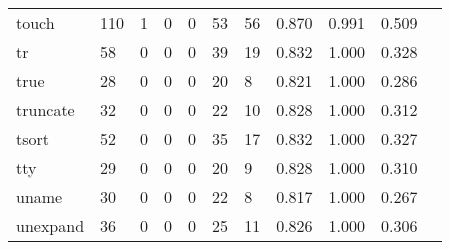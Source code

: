 \begin{longtable}{lp{1.10cm}p{1.10cm}p{1.10cm}p{1.10cm}p{1.10cm}p{1.10cm}p{1.10cm}p{1.10cm}p{1.10cm}p{1.10cm}}
touch     &                    110 &                                  1 &                                 0 &                                0 &                                53 &                              56 &                          0.870 &                                 0.991 &                               0.509 \\
tr        &                     58 &                                  0 &                                 0 &                                0 &                                39 &                              19 &                          0.832 &                                 1.000 &                               0.328 \\
true      &                     28 &                                  0 &                                 0 &                                0 &                                20 &                               8 &                          0.821 &                                 1.000 &                               0.286 \\
truncate  &                     32 &                                  0 &                                 0 &                                0 &                                22 &                              10 &                          0.828 &                                 1.000 &                               0.312 \\
tsort     &                     52 &                                  0 &                                 0 &                                0 &                                35 &                              17 &                          0.832 &                                 1.000 &                               0.327 \\
tty       &                     29 &                                  0 &                                 0 &                                0 &                                20 &                               9 &                          0.828 &                                 1.000 &                               0.310 \\
uname     &                     30 &                                  0 &                                 0 &                                0 &                                22 &                               8 &                          0.817 &                                 1.000 &                               0.267 \\
unexpand  &                     36 &                                  0 &                                 0 &                                0 &                                25 &                              11 &                          0.826 &                                 1.000 &                               0.306 \\

\end{longtable}
